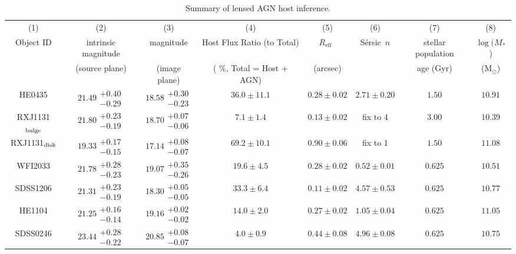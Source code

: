 \documentclass[fleqn,usenatbib]{mnras}
\newcommand{\sersic}{S\'ersic}
\newcommand{\reff}{{$R_{\mathrm{eff}}$}}
\begin{document}
\begin{table}
\renewcommand{\arraystretch}{1.25}
\centering
  \begin{threeparttable}
\caption{Summary of lensed AGN host inference.}\label{tab:host_measure}    
     \begin{tabular}{cccccccc}
\hline     
(1) & (2) & (3) & (4) & (5) & (6) & (7) & (8) \\    
Object ID & intrinsic magnitude & magnitude & Host Flux Ratio (to Total) & \reff\ & \sersic\ $n$ & stellar population & $\log (M_{*}$)  \\
 & (source plane) & (image plane) & ( $\%$, Total = Host + AGN) & (arcsec) & & age (Gyr) & (M$_{\odot}$) \\ \hline
HE0435 & $21.49\substack{+0.40\\-0.29}$ & $18.58\substack{+0.30\\-0.23}$ & $36.0\pm11.1$ & $0.28\pm0.02$ & $2.71\pm0.20$ & $1.50$ & $10.91$ \\
RXJ1131$_{\rm bulge}$ & $21.80\substack{+0.23\\-0.19}$ & $18.70\substack{+0.07\\-0.06}$ & $7.1\pm1.4$ & $0.13\pm0.02$ & fix to 4 & $3.00$ & $10.39$ \\
RXJ1131$_{\rm disk}$ & $19.33\substack{+0.17\\-0.15}$ & $17.14\substack{+0.08\\-0.07}$ & $69.2\pm10.1$ & $0.90\pm0.06$ & fix to 1 & $1.50$ & $11.08$ \\
WFI2033 & $21.78\substack{+0.28\\-0.23}$ & $19.07\substack{+0.35\\-0.26}$ & $19.6\pm4.5$ & $0.28\pm0.02$ & $0.52\pm0.01$ & $0.625$ & $10.51$ \\
SDSS1206 & $21.31\substack{+0.23\\-0.19}$ & $18.30\substack{+0.05\\-0.05}$ & $33.3\pm6.4$ & $0.11\pm0.02$ & $4.57\pm0.53$ & $0.625$ & $10.77$ \\
HE1104 & $21.25\substack{+0.16\\-0.14}$ & $19.16\substack{+0.02\\-0.02}$ & $14.0\pm2.0$ & $0.27\pm0.02$ & $1.05\pm0.04$ & $0.625$ & $11.05$ \\
SDSS0246 & $23.44\substack{+0.28\\-0.22}$ & $20.85\substack{+0.08\\-0.07}$ & $4.0\pm0.9$ & $0.44\pm0.08$ & $4.96\pm0.08$ & $0.625$ & $10.75$ \\

\end{tabular}
\end{threeparttable}
\end{table}
\end{document}

